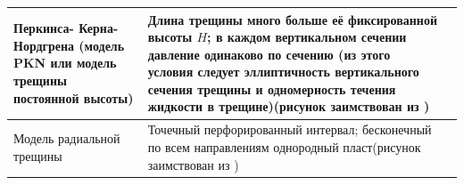 \begin{longtable}[l]{|L{2.2cm}|m{7.3cm}|L{6.2cm}|}
	Перкинса- Керна- Нордгрена (модель PKN или модель трещины постоянной высоты)&Длина трещины много больше её фиксированной высоты $H$; в каждом вертикальном сечении давление одинаково по сечению (из этого условия следует эллиптичность вертикального сечения трещины и одномерность течения жидкости в трещине)\break\hfill\break (рисунок заимствован из \cite{adachi})&\hfill\break{}\hfill\break\\ \hline
	Модель радиальной трещины&Точечный перфорированный интервал; бесконечный по всем направлениям однородный пласт\break\hfill\break (рисунок заимствован из \cite{adachi})&\hfill\break{}\hfill\break\\ \hline

\end{longtable}
